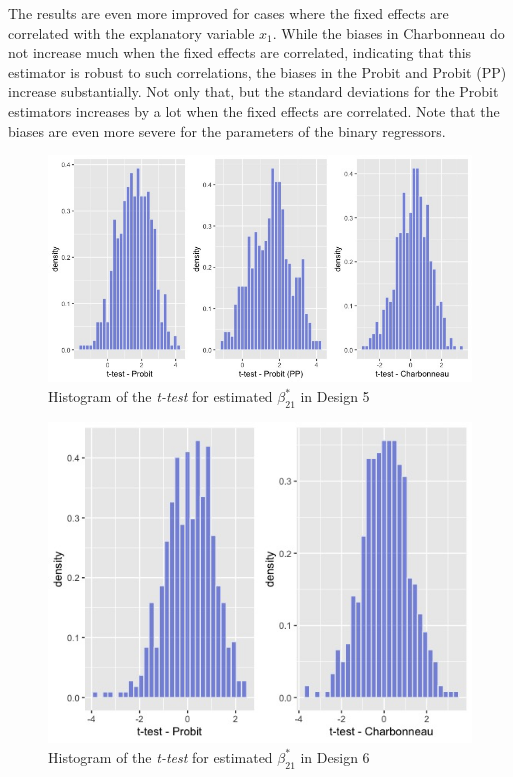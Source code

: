 The results are even more improved for cases where the fixed effects are correlated with the explanatory variable $x_1$. While the biases in Charbonneau do not increase much when the fixed effects are correlated, indicating that this estimator is robust to such correlations, the biases in the Probit and Probit (PP) increase substantially. Not only that, but the standard deviations for the Probit estimators increases by a lot when the fixed effects are correlated. Note that the biases are even more severe for the parameters of the binary regressors.
\begin{figure}
  \centerline{\includegraphics[scale=.4]{content/Figures/ttest_beta21_Design5.png}}
  \caption{\footnotesize{Histogram of the \textit{t-test} for estimated $\beta_{21}^*$ in Design 5}}
  \label{ttest_beta21_Design5}
\end{figure}
\begin{figure}
  \centerline{\includegraphics[scale=.4]{content/Figures/ttest_beta21_Design6.png}}
  \caption{\footnotesize{Histogram of the \textit{t-test} for estimated $\beta_{21}^*$ in Design 6}}
  \label{ttest_beta21_Design6}
\end{figure}
